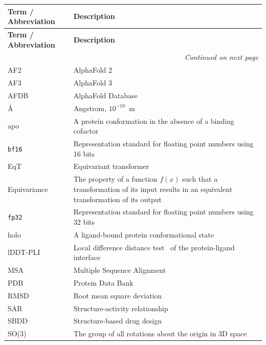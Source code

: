 \documentclass[11pt, letterpaper, onecolumn]{tau-class/tau}
\let\oldAA\AA
\renewcommand{\AA}{\oldAA\xspace}
\begin{document}
\begin{longtable}{@{}p{} p{}@{}}

\toprule
\textbf{Term / Abbreviation} & \textbf{Description} \\
\midrule
\endfirsthead

\toprule
\textbf{Term / Abbreviation} & \textbf{Description} \\
\midrule
\endhead

\midrule
\multicolumn{2}{r}{\textit{Continued on next page}} \\
\bottomrule
\endfoot

\bottomrule
\endlastfoot

AF2 & AlphaFold 2~\cite{af2} \\
AF3 & AlphaFold 3~\cite{abramson2024accurate} \\
AFDB & AlphaFold Database~\cite{varadi2024alphafold} \\
\AA & Angstrom, $10^{-10}$~m \\
apo & A protein conformation in the absence of a binding cofactor \\
\texttt{bf16} & Representation standard for floating point numbers using 16 bits \\
EqT & Equivariant transformer \\
Equivariance & The property of a function $f(x)$ such that a transformation of its input results in an equivalent transformation of its output \\
\texttt{fp32} & Representation standard for floating point numbers using 32 bits \\
holo & A ligand-bound protein conformational state \\
lDDT-PLI & Local difference distance test~\cite{Mariani2013lddt} of the protein-ligand interface \\
MSA & Multiple Sequence Alignment \\
PDB & Protein Data Bank~\cite{berman2000protein} \\
RMSD & Root mean square deviation \\
SAR & Structure-activity relationship \\
SBDD & Structure-based drug design \\
SO(3) & The group of all rotations about the origin in 3D space \\
\end{longtable} 
\end{document}

